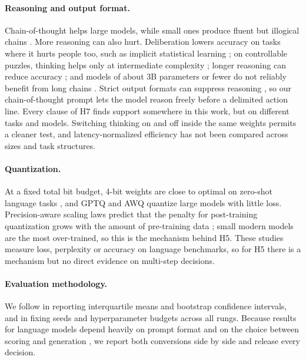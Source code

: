 \paragraph{Reasoning and output format.}
Chain-of-thought helps large models, while small ones produce fluent but illogical chains \citep{wei2022cot}. More reasoning can also hurt. Deliberation lowers accuracy on tasks where it hurts people too, such as implicit statistical learning \citep{liu2025mindstep}; on controllable puzzles, thinking helps only at intermediate complexity \citep{shojaee2025illusion}; longer reasoning can reduce accuracy \citep{gema2025inverse}; and models of about 3B parameters or fewer do not reliably benefit from long chains \citep{li2025smallstruggle}. Strict output formats can suppress reasoning \citep{tam2024speakfreely}, so our chain-of-thought prompt lets the model reason freely before a delimited action line. Every clause of H7 finds support somewhere in this work, but on different tasks and models. Switching thinking on and off inside the same weights \citep{yang2025qwen3} permits a cleaner test, and latency-normalized efficiency has not been compared across sizes and task structures.

\paragraph{Quantization.}
At a fixed total bit budget, 4-bit weights are close to optimal on zero-shot language tasks \citep{dettmers2023kbit}, and GPTQ \citep{frantar2023gptq} and AWQ \citep{lin2024awq} quantize large models with little loss. Precision-aware scaling laws predict that the penalty for post-training quantization grows with the amount of pre-training data \citep{kumar2025precision}; small modern models are the most over-trained, so this is the mechanism behind H5. These studies measure loss, perplexity or accuracy on language benchmarks, so for H5 there is a mechanism but no direct evidence on multi-step decisions.

\paragraph{Evaluation methodology.}
We follow \citet{agarwal2021precipice} in reporting interquartile means and bootstrap confidence intervals, and \citet{henderson2018matters} in fixing seeds and hyperparameter budgets across all rungs. Because results for language models depend heavily on prompt format and on the choice between scoring and generation \citep{sclar2024formatting,wang2024myanswerc}, we report both conversions side by side and release every decision.

